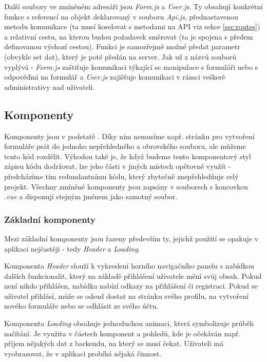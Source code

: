	Další soubory ve zmíněném adresáři jsou \textit{Form.js} a \textit{User.js}. Ty obsahují konkrétní funkce s referencí na objekt deklarovaný v souboru \textit{Api.js}, přednastavenou metodu komunikace (ta musí korelovat s metodami na API viz sekce \ref{sec:routes}) a relativní cestu, na kterou budou požadavek směrovat (ta je spojena s předem definovanou výchozí cestou). Funkci je samozřejmě možné předat parametr (obvykle set dat), který je poté předán na server. Jak už z názvů souborů vyplývá - \textit{Form.js} zaštiťuje komunikaci týkající se manipulace s formuláři nebo s odpověďmi na formulář a \textit{User.js} zajišťuje komunikaci v rámci veškeré administrativy nad uživateli.
	
	\subsection{Komponenty}
	Komponenty jsou v podstatě . Díky nim nemusíme např. stránku pro vytvoření formuláře psát do jednoho nepřehledného a obrovského souboru, ale můžeme tento kód rozdělit. Výhodou také je, že když budeme tento komponentový styl zápisu kódu dodržovat, lze jeho části v jiných místech opětovně využít - předcházíme tím redundantnímu kódu, který zbytečně znepřehledňuje celý projekt. Všechny zmíněné komponenty jsou zapsány v souborech s koncovkou \textit{.vue} a disponují stejným jménem jako samotný soubor.
		
		\subsubsection{Základní komponenty} %
		Mezi základní komponenty jsou řazeny především ty, jejichž použití se opakuje v aplikaci nejčastěji - tedy \textit{Header} a \textit{Loading}. 
		
		Komponenta \textit{Header} slouží k vykreslení horního navigačního panelu s nabídkou dalších funkcionalit, který na základě přihlášení uživatele mění svůj obsah. Pokud není nikdo přihlášen, nabídka nabízí odkazy na přihlášení či registraci. Pokud se uživatel přihlásí, může se odsud dostat na stránku svého profilu, na vytvoření nového formuláře nebo se odhlásit ze svého účtu.
		
		Komponenta \textit{Loading} obsahuje jednoduchou animaci, která symbolizuje průběh načítání. Je využita v částech komponent a pohledů, kde je očekáván např. příjem nějakých dat z backendu, na který se musí čekat. Uživateli má vyobrazovat, že v aplikaci probíhá nějaká činnost.
		
